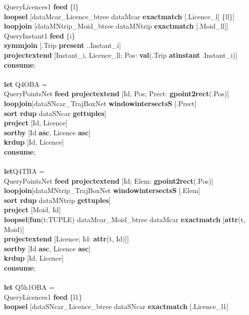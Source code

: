 \documentclass[a4paper]{article}
\newcommand{\op}[1]{\textbf{#1}}
\begin{document}
\begin{scriptsize}
\begin{tabbing}
\>QueryLicences1 \op{feed} \{l\}\\
\>\>\op{loopsel} [dataMcar\_Licence\_btree dataMcar \op{exactmatch} [.Licence\_l] \{ll\}]\\
\>\>\op{loopjoin} [dataMNtrip\_Moid\_btree dataMNtrip
\op{exactmatch} [.Moid\_ll]]\\
\>QueryInstant1 \op{feed} \{i\}\\
\>\op{symmjoin} [.Trip \op{present} ..Instant\_i]\\
\>\op{projectextend} [Instant\_i, Licence\_ll; Pos: \op{val}(.Trip
\op{atinstant} .Instant\_i)]\\
\op{consume};\\
\\
\op{let} Q4OBA =\\
\> QueryPointsNet \op{feed projectextend} [Id, Pos; Prect: \op{gpoint2rect}(.Pos)]\\
\>\op{loopjoin}[dataSNcar\_TrajBoxNet \op{windowintersectsS} [.Prect]\\
\>\>\>\op{sort rdup} dataSNcar \op{gettuples}]\\
\>\op{project} [Id, Licence]\\
\>\op{sortby} [Id \op{asc}, Licence \op{asc}]\\
\>\op{krdup} [Id, Licence]\\
\op{consume};\\
\\
\op{let}Q4TBA =\\
\>QueryPointsNet \op{feed projectextend} [Id; Elem: \op{gpoint2rect}(.Pos)]\\
\>\op{loopjoin}[dataMNtrip\_TrajBoxNet \op{windowintersectsS} [.Elem]\\
\>\>\>\op{sort rdup} dataMNtrip \op{gettuples}]\\
\>\op{project} [Moid, Id]\\
\>\op{loopsel}[\op{fun}(t:TUPLE) dataMcar\_Moid\_btree dataMcar \op{exactmatch} [\op{attr}(t, Moid)]\\
\>\>\op{projectextend} [Licence; Id: \op{attr}(t, Id)]]\\
\>\op{sortby} [Id \op{asc}, Licence \op{asc}]\\
\>\op{krdup} [Id, Licence]\\
\op{consume};\\
\\
\op{let} Q5h1OBA =\\
\>QueryLicences1 \op{feed} \{l1\}\\
\>\op{loopsel} [dataSNcar\_Licence\_btree dataSNcar \op{exactmatch} [.Licence\_l1]\\

\end{tabbing}
\end{scriptsize}
\end{document}
